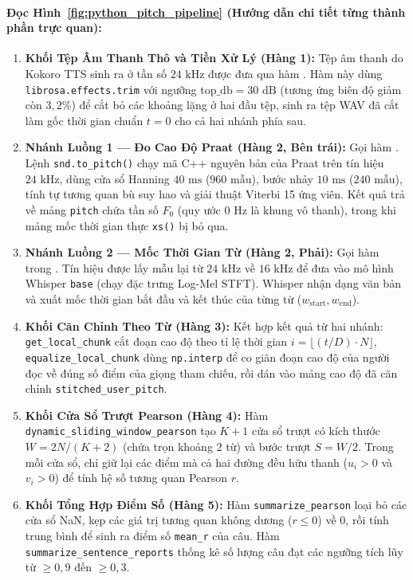 \documentclass[11pt,a4paper]{article}
\begin{document}
\paragraph{Đọc Hình~\ref{fig:python_pitch_pipeline} (Hướng dẫn chi tiết từng thành phần trực quan):}
\begin{enumerate}
    \setlength{\itemsep}{1.5pt}
    \item \textbf{Khối Tệp Âm Thanh Thô và Tiền Xử Lý (Hàng 1):} Tệp âm thanh do Kokoro TTS sinh ra ở tần số $24\text{ kHz}$ được đưa qua hàm . Hàm này dùng \texttt{librosa.effects.trim} với ngưỡng $\text{top\_db} = 30\text{ dB}$ (tương ứng biên độ giảm còn $3{,}2\%$) để cắt bỏ các khoảng lặng ở hai đầu tệp, sinh ra tệp WAV đã cắt làm gốc thời gian chuẩn $t = 0$ cho cả hai nhánh phía sau.
    \item \textbf{Nhánh Luồng 1 --- Đo Cao Độ Praat (Hàng 2, Bên trái):} Gọi hàm . Lệnh \texttt{snd.to\_pitch()} chạy mã C++ nguyên bản của Praat trên tín hiệu $24\text{ kHz}$, dùng cửa sổ Hanning $40\text{ ms}$ ($960\text{ mẫu}$), bước nhảy $10\text{ ms}$ ($240\text{ mẫu}$), tính tự tương quan bù suy hao và giải thuật Viterbi 15 ứng viên. Kết quả trả về mảng \texttt{pitch} chứa tần số $F_0$ (quy ước $0\text{ Hz}$ là khung vô thanh), trong khi mảng mốc thời gian thực \texttt{xs()} bị bỏ qua.
    \item \textbf{Nhánh Luồng 2 --- Mốc Thời Gian Từ (Hàng 2, Phải):} Gọi hàm  trong . Tín hiệu được lấy mẫu lại từ $24\text{ kHz}$ về $16\text{ kHz}$ để đưa vào mô hình Whisper \texttt{base} (chạy đặc trưng Log-Mel STFT). Whisper nhận dạng văn bản và xuất mốc thời gian bắt đầu và kết thúc của từng từ ($w_{\text{start}}, w_{\text{end}}$).
    \item \textbf{Khối Căn Chỉnh Theo Từ (Hàng 3):} Kết hợp kết quả từ hai nhánh: \texttt{get\_local\_chunk} cắt đoạn cao độ theo tỉ lệ thời gian $i = \lfloor (t/D) \cdot N \rfloor$, \texttt{equalize\_local\_chunk} dùng \texttt{np.interp} để co giãn đoạn cao độ của người đọc về đúng số điểm của giọng tham chiếu, rồi dán vào mảng cao độ đã căn chỉnh \texttt{stitched\_user\_pitch}.
    \item \textbf{Khối Cửa Sổ Trượt Pearson (Hàng 4):} Hàm \texttt{dynamic\_sliding\_window\_pearson} tạo $K+1$ cửa sổ trượt có kích thước $W = 2N/(K+2)$ (chứa trọn khoảng 2 từ) và bước trượt $S = W/2$. Trong mỗi cửa sổ, chỉ giữ lại các điểm mà cả hai đường đều hữu thanh ($u_i > 0$ và $v_i > 0$) để tính hệ số tương quan Pearson $r$.
    \item \textbf{Khối Tổng Hợp Điểm Số (Hàng 5):} Hàm \texttt{summarize\_pearson} loại bỏ các cửa sổ NaN, kẹp các giá trị tương quan không dương ($r \le 0$) về $0$, rồi tính trung bình để sinh ra điểm số \texttt{mean\_r} của câu. Hàm \texttt{summarize\_sentence\_reports} thống kê số lượng câu đạt các ngưỡng tích lũy từ $\ge 0{,}9$ đến $\ge 0{,}3$.
\end{enumerate}
\end{document}
